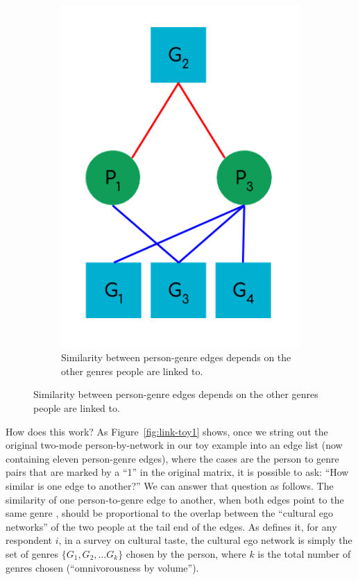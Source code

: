 \documentclass[a4paper,12pt]{extarticle}
\begin{document}
\begin{figure}[t!]
\begin{subfigure}[b]{0.3\textwidth}
        \includegraphics[width=1.0\textwidth]{Toy/link-clust-toy2.png}
        \caption{Similarity between person-genre edges depends on the other genres people are linked to.}
        \label{fig:link-toy2}
    \end{subfigure}
\end{figure}
 
How does this work? As Figure~\ref{fig:link-toy1} shows, once we string out the original two-mode person-by-network in our toy example into an edge list (now containing eleven person-genre edges), where the cases are the person to genre pairs that are marked by a ``1'' in the original matrix, it is possible to ask: ``How similar is one edge to another?'' We can answer that question as follows. The similarity of one person-to-genre edge to another, when both edges point to the same genre \citep{ahn_etal10}, should be proportional to the overlap between the ``cultural ego networks'' of the two people at the tail end of the edges. As \citet{lizardo14} defines it, for any respondent $i$, in a survey on cultural taste, the cultural ego network is simply the set of genres $\{G_1, G_2,\dots G_k\}$ chosen by the person, where $k$ is the total number of genres chosen (``omnivorousness by volume''). 
\end{document}

